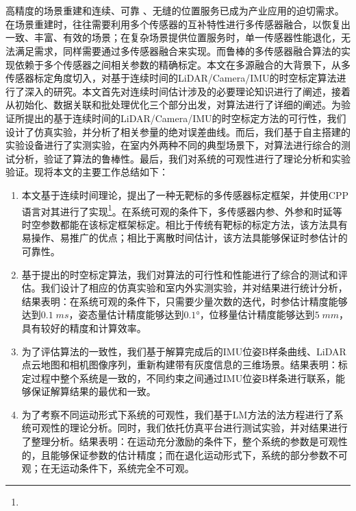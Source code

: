 \chapter{}
\section{}
高精度的场景重建和连续、可靠 、无缝的位置服务已成为产业应用的迫切需求。在场景重建时，往往需要利用多个传感器的互补特性进行多传感器融合，以恢复出一致、丰富、有效的场景；在复杂场景提供位置服务时，单一传感器性能退化，无法满足需求，同样需要通过多传感器融合来实现。而鲁棒的多传感器融合算法的实现依赖于多个传感器之间相关参数的精确标定。本文在多源融合的大背景下，从多传感器标定角度切入，对基于连续时间的LiDAR/Camera/IMU的时空标定算法进行了深入的研究。本文首先对连续时间估计涉及的必要理论知识进行了阐述，接着从初始化、数据关联和批处理优化三个部分出发，对算法进行了详细的阐述。为验证所提出的基于连续时间的LiDAR/Camera/IMU的时空标定方法的可行性，我们设计了仿真实验，并分析了相关参量的绝对误差曲线。而后，我们基于自主搭建的实验设备进行了实测实验，在室内外两种不同的典型场景下，对算法进行综合的测试分析，验证了算法的鲁棒性。最后，我们对系统的可观性进行了理论分析和实验验证。现将本文的主要工作总结如下：
\begin{enumerate}
  \item 本文基于连续时间理论，提出了一种无靶标的多传感器标定框架，并使用CPP语言对其进行了实现\footnote{}。在系统可观的条件下，多传感器内参、外参和时延等时空参数都能在该标定框架标定。相比于传统有靶标的标定方法，该方法具有易操作、易推广的优点；相比于离散时间估计，该方法具能够保证时参估计的可靠性。

  \item 基于提出的时空标定算法，我们对算法的可行性和性能进行了综合的测试和评估。我们设计了相应的仿真实验和室内外实测实验，并对结果进行统计分析，结果表明：在系统可观的条件下，只需要少量次数的迭代，时参估计精度能够达到$0.1\;ms$，姿态量估计精度能够达到$0.1°$，位移量估计精度能够达到$5\;mm$，具有较好的精度和计算效率。

  \item 为了评估算法的一致性，我们基于解算完成后的IMU位姿B样条曲线、LiDAR点云地图和相机图像序列，重新构建带有灰度信息的三维场景。结果表明：标定过程中整个系统是一致的，不同约束之间通过IMU位姿B样条进行联系，能够保证解算结果的最优和一致。

  \item 为了考察不同运动形式下系统的可观性，我们基于LM方法的法方程进行了系统可观性的理论分析。同时，我们依托仿真平台进行测试实验，并对结果进行了整理分析。结果表明：在运动充分激励的条件下，整个系统的参数是可观性的，且能够保证参数的估计精度；而在退化运动形式下，系统的部分参数不可观；在无运动条件下，系统完全不可观。
\end{enumerate}
